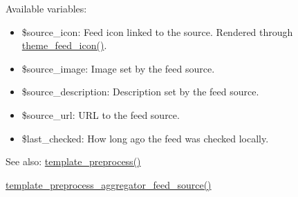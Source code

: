 Available variables:\begin{itemize}
\item \$source\_\-icon: Feed icon linked to the source. Rendered through \hyperlink{group__themeable_ge5d10f67376dfa4cd18256bf1d496169}{theme\_\-feed\_\-icon()}.\item \$source\_\-image: Image set by the feed source.\item \$source\_\-description: Description set by the feed source.\item \$source\_\-url: URL to the feed source.\item \$last\_\-checked: How long ago the feed was checked locally.\end{itemize}


\begin{Desc}
\item[See also:]\hyperlink{includes_2theme_8inc_3eeb7bcdba7ef4859f99586da264d347}{template\_\-preprocess()} 

\hyperlink{aggregator_8pages_8inc_06bc89c22bcd3b3c70c9c1d19391aefc}{template\_\-preprocess\_\-aggregator\_\-feed\_\-source()} \end{Desc}
